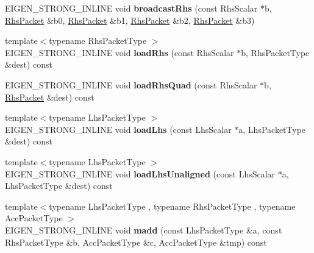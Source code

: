 \begin{DoxyCompactItemize}
E\+I\+G\+E\+N\+\_\+\+S\+T\+R\+O\+N\+G\+\_\+\+I\+N\+L\+I\+NE void {\bfseries broadcast\+Rhs} (const Rhs\+Scalar $\ast$b, \hyperlink{class_eigen_1_1internal_1_1_tensor_lazy_evaluator_writable}{Rhs\+Packet} \&b0, \hyperlink{class_eigen_1_1internal_1_1_tensor_lazy_evaluator_writable}{Rhs\+Packet} \&b1, \hyperlink{class_eigen_1_1internal_1_1_tensor_lazy_evaluator_writable}{Rhs\+Packet} \&b2, \hyperlink{class_eigen_1_1internal_1_1_tensor_lazy_evaluator_writable}{Rhs\+Packet} \&b3)
\item 
\mbox{\label{class_eigen_1_1internal_1_1gebp__traits_aa9ae85d85eae99a248dae6b2350999db}} 
{\footnotesize template$<$typename Rhs\+Packet\+Type $>$ }\\E\+I\+G\+E\+N\+\_\+\+S\+T\+R\+O\+N\+G\+\_\+\+I\+N\+L\+I\+NE void {\bfseries load\+Rhs} (const Rhs\+Scalar $\ast$b, Rhs\+Packet\+Type \&dest) const
\item 
\mbox{\label{class_eigen_1_1internal_1_1gebp__traits_a24faddc403d5ca4609bc0c3ccef20549}} 
E\+I\+G\+E\+N\+\_\+\+S\+T\+R\+O\+N\+G\+\_\+\+I\+N\+L\+I\+NE void {\bfseries load\+Rhs\+Quad} (const Rhs\+Scalar $\ast$b, \hyperlink{class_eigen_1_1internal_1_1_tensor_lazy_evaluator_writable}{Rhs\+Packet} \&dest) const
\item 
\mbox{\label{class_eigen_1_1internal_1_1gebp__traits_a4eb22d4856136599f64daf69b42b30d7}} 
{\footnotesize template$<$typename Lhs\+Packet\+Type $>$ }\\E\+I\+G\+E\+N\+\_\+\+S\+T\+R\+O\+N\+G\+\_\+\+I\+N\+L\+I\+NE void {\bfseries load\+Lhs} (const Lhs\+Scalar $\ast$a, Lhs\+Packet\+Type \&dest) const
\item 
\mbox{\label{class_eigen_1_1internal_1_1gebp__traits_a7a8bf55c8af443448a3f95cd1afecfdf}} 
{\footnotesize template$<$typename Lhs\+Packet\+Type $>$ }\\E\+I\+G\+E\+N\+\_\+\+S\+T\+R\+O\+N\+G\+\_\+\+I\+N\+L\+I\+NE void {\bfseries load\+Lhs\+Unaligned} (const Lhs\+Scalar $\ast$a, Lhs\+Packet\+Type \&dest) const
\item 
\mbox{\label{class_eigen_1_1internal_1_1gebp__traits_a34a49fe7eba0d98b4fb04e2303a17935}} 
{\footnotesize template$<$typename Lhs\+Packet\+Type , typename Rhs\+Packet\+Type , typename Acc\+Packet\+Type $>$ }\\E\+I\+G\+E\+N\+\_\+\+S\+T\+R\+O\+N\+G\+\_\+\+I\+N\+L\+I\+NE void {\bfseries madd} (const Lhs\+Packet\+Type \&a, const Rhs\+Packet\+Type \&b, Acc\+Packet\+Type \&c, Acc\+Packet\+Type \&tmp) const

\end{DoxyCompactItemize}
